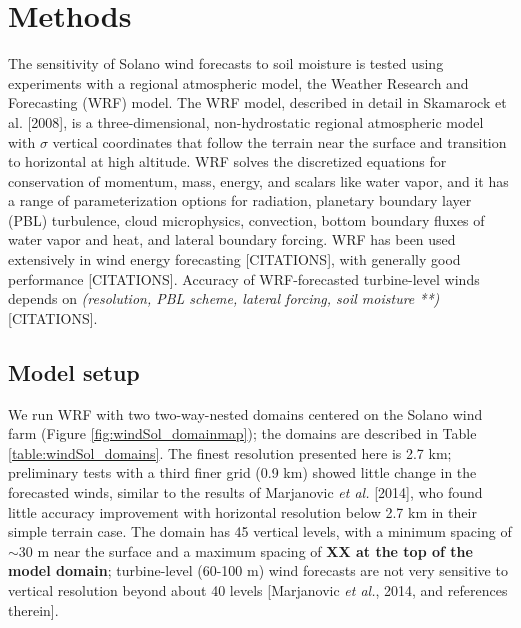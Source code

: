 
%
%
%
%
%

\section{Methods}

The sensitivity of Solano wind forecasts to soil moisture is tested using experiments with a regional atmospheric model, the Weather Research and Forecasting (WRF) model.  The WRF model, described in detail in Skamarock et al. [2008], is a three-dimensional, non-hydrostatic regional atmospheric model with $\sigma$ vertical coordinates that follow the terrain near the surface and transition to horizontal at high altitude.  WRF solves the discretized equations for conservation of momentum, mass, energy, and scalars like water vapor, and it has a range of parameterization options for radiation, planetary boundary layer (PBL) turbulence, cloud microphysics, convection, bottom boundary fluxes of water vapor and heat, and lateral boundary forcing.  WRF has been used extensively in wind energy forecasting [CITATIONS], with generally good performance [CITATIONS].  Accuracy of WRF-forecasted turbine-level winds depends on \textit{(resolution, PBL scheme, lateral forcing, soil moisture **)} [CITATIONS].

\subsection{Model setup}

We run WRF with two two-way-nested domains centered on the Solano wind farm (Figure \ref{fig:windSol_domainmap}); the domains are described in Table \ref{table:windSol_domains}.  The finest resolution presented here is 2.7 km; preliminary tests with a third finer grid (0.9 km) showed little change in the forecasted winds, similar to the results of Marjanovic \textit{et al.} [2014], who found little accuracy improvement with horizontal resolution below 2.7 km in their simple terrain case.  The domain has 45 vertical levels, with a minimum spacing of $\sim$30 m near the surface and a maximum spacing of \textbf{XX at the top of the model domain}; turbine-level (60-100 m) wind forecasts are not very sensitive to vertical resolution beyond about 40 levels [Marjanovic \textit{et al.}, 2014, and references therein].

